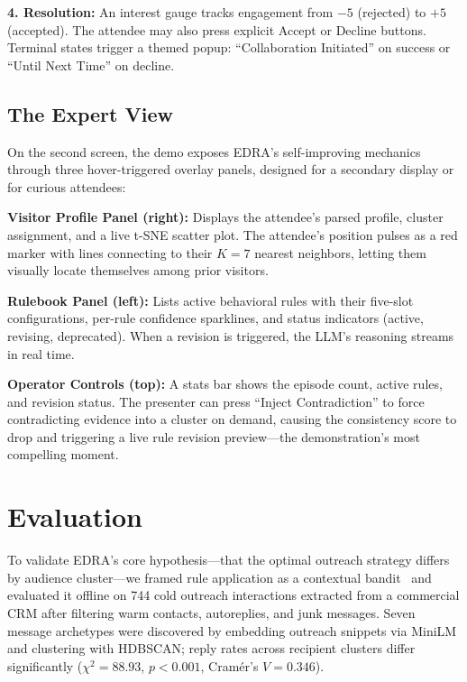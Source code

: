 \documentclass[sigconf]{acmart}
\begin{document}
\noindent \textbf{4. Resolution:} An interest gauge tracks engagement from $-5$ (rejected) to $+5$ (accepted). The attendee may also press explicit Accept or Decline buttons. Terminal states trigger a themed popup: ``Collaboration Initiated'' on success or ``Until Next Time'' on decline.
\vspace{-2em}

\subsection{The Expert View}
On the second screen, the demo exposes EDRA's self-improving mechanics through three hover-triggered overlay panels, designed for a secondary display or for curious attendees:

\noindent \textbf{Visitor Profile Panel (right):} Displays the attendee's parsed profile, cluster assignment, and a live t-SNE scatter plot. The attendee's position pulses as a red marker with lines connecting to their $K=7$ nearest neighbors, letting them visually locate themselves among prior visitors.

\noindent \textbf{Rulebook Panel (left):} Lists active behavioral rules with their five-slot configurations, per-rule confidence sparklines, and status indicators (active, revising, deprecated). When a revision is triggered, the LLM's reasoning streams in real time.

\noindent \textbf{Operator Controls (top):} A stats bar shows the episode count, active rules, and revision status. The presenter can press ``Inject Contradiction'' to force contradicting evidence into a cluster on demand, causing the consistency score to drop and triggering a live rule revision preview---the demonstration's most compelling moment.


\section{Evaluation}
To validate EDRA's core hypothesis---that the optimal outreach strategy differs by audience cluster---we framed rule application as a contextual bandit~\cite{li2010contextual} and evaluated it offline on 744 cold outreach interactions extracted from a commercial CRM after filtering warm contacts, autoreplies, and junk messages. Seven message archetypes were discovered by embedding outreach snippets via MiniLM and clustering with HDBSCAN; reply rates across recipient clusters differ significantly ($\chi^2 = 88.93$, $p < 0.001$, Cram\'{e}r's $V = 0.346$).
\end{document}
